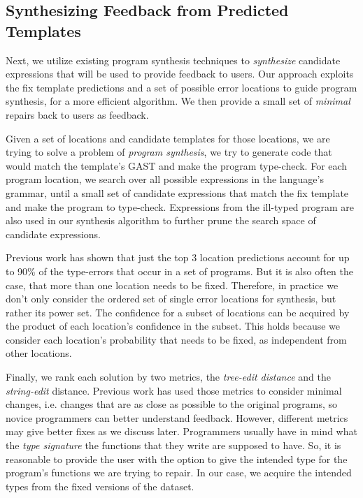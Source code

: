 \subsection{Synthesizing Feedback from Predicted Templates}
\label{sec:overview:synthesis}

Next, we utilize existing program synthesis techniques to \emph{synthesize}
candidate expressions that will be used to provide feedback to users. Our
approach exploits the fix template predictions and a set of possible error
locations to guide program synthesis, for a more efficient algorithm. We then
provide a small set of \emph{minimal} repairs back to users as feedback.

 Given a set of locations and candidate templates for
those locations, we are trying to solve a problem of \emph{program synthesis},
\ie we try to generate code that would match the template’s GAST and make the
program type-check. For each program location, we search over all possible
expressions in the language's grammar, until a small set of candidate
expressions that match the fix template and make the program to type-check.
Expressions from the ill-typed program are also used in our synthesis algorithm
to further prune the search space of candidate expressions.

 Previous work has shown that just the
top 3 location predictions account for up to 90\% of the type-errors that occur
in a set of programs. But it is also often the case, that more than one location
needs to be fixed. Therefore, in practice we don't only consider the ordered set
of single error locations for synthesis, but rather its power set. The
confidence for a subset of locations can be acquired by the product of each
location’s confidence in the subset. This holds because we consider each
location’s probability that needs to be fixed, as independent from other
locations.

 Finally, we rank each solution by two metrics, the
\emph{tree-edit distance} and the \emph{string-edit} distance. Previous work has
used those metrics to consider minimal changes, i.e. changes that are as close
as possible to the original programs, so novice programmers can better
understand feedback. However, different metrics may give better fixes as we
discuss later. Programmers usually have in mind what the \emph{type signature}
the functions that they write are supposed to have. So, it is reasonable to
provide the user with the option to give the intended type for the program's
functions we are trying to repair. In our case, we acquire the intended types
from the fixed versions of the dataset.

